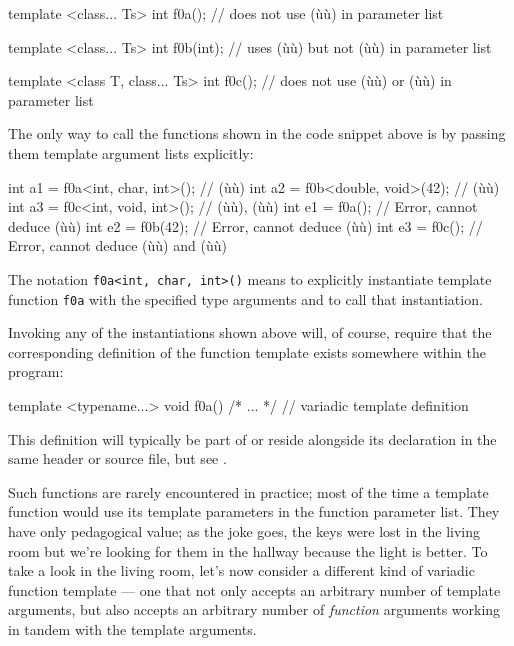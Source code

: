 \begin{emcppslisting}
template <class... Ts>
int f0a();     // does not use (ù{}ù) in parameter list

template <class... Ts>
int f0b(int);  // uses (ù{}ù) but not (ù{}ù) in parameter list

template <class T, class... Ts>
int f0c();     // does not use (ù{}ù) or (ù{}ù) in parameter list
\end{emcppslisting}
    

\noindent The only way to call the functions shown in the code snippet above is by
passing them template argument lists explicitly:

\begin{emcppslisting}
int a1 = f0a<int, char, int>();  // (ù{}ù)
int a2 = f0b<double, void>(42);  // (ù{}ù)
int a3 = f0c<int, void, int>();  // (ù{}ù), (ù{}ù)
int e1 = f0a();                  // Error, cannot deduce (ù{}ù)
int e2 = f0b(42);                // Error, cannot deduce (ù{}ù)
int e3 = f0c();                  // Error, cannot deduce (ù{}ù) and (ù{}ù)
\end{emcppslisting}
    

\noindent The notation \lstinline!f0a<int,!~\lstinline!char,!~\lstinline!int>()! means to
explicitly instantiate template function \lstinline!f0a! with the specified
type arguments and to call that instantiation.

Invoking any of the instantiations shown above will, of course, require
that the corresponding definition of the function template exists
somewhere within the program:

\begin{emcppslisting}
template <typename...> void f0a() { /* ... */ }  // variadic template definition
\end{emcppslisting}
    

\noindent This definition will typically be part of or reside alongside its
declaration in the same header or source file, but see
.

Such functions are rarely encountered in practice; most of the time a
template function would use its template parameters in the function
parameter list. They have only pedagogical value; as the joke goes, the
keys were lost in the living room but we're looking for them in the
hallway because the light is better. To take a look in the living room,
let's now consider a different kind of variadic function template ---
one that not only accepts an arbitrary number of template arguments, but
also accepts an arbitrary number of \emph{function} arguments working in
tandem with the template arguments.


